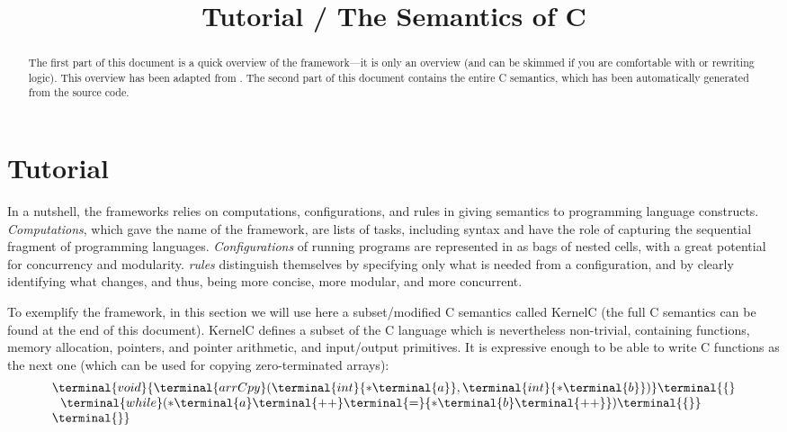 \documentclass{article}
\title{\K Tutorial \slash{} The Semantics of C}
\begin{document}
\maketitle

\begin{abstract}The first part of this document is a quick overview of the \K framework---it is only an overview (and can be skimmed if you are comfortable with \K or rewriting logic).  This overview has been adapted from \citet{serbanuta-2010-thesis}.  The second part of this document contains the entire C semantics, which has been automatically generated from the source code.
\end{abstract}

\section{\K Tutorial}
In a nutshell, the \K frameworks relies on computations, configurations, and \K rules in giving semantics to programming language constructs.  
{\em Computations}, which gave the name of the framework, are lists of tasks, including syntax and have the role of capturing the sequential fragment of programming languages.  {\em Configurations} of running programs are represented in \K as bags of nested cells, with a great potential for concurrency and modularity.  {\em \K rules} distinguish themselves by specifying only what is needed from a configuration, and by clearly identifying what changes, and thus, being more concise, more modular, and more concurrent.

To exemplify the \K framework, in this section we will use here a subset/modified C semantics called {\sc KernelC} (the full C semantics can be found at the end of this document).   {\sc KernelC} defines a subset of the C language which is nevertheless non-trivial, containing functions, memory allocation, pointers, and pointer arithmetic, and input/output primitives.  It is expressive enough to be able to write C functions as the next one (which can be used for copying zero-terminated arrays):
\[\begin{array}{l}
\terminal{void}
{
  {\terminal{arrCpy}
  }
  (\terminal{int}{
    \ast\terminal{a}
    }, \terminal{int}{
     \ast\terminal{b}
     }
     ) }
     \terminal{\{} \\
     \ \ \terminal{while}   (
     {  
       {\ast\terminal{a}}
       \terminal{++}
     }\terminal{=}
     {
     {\ast\terminal{b}}
     \terminal{++}
     }
     )\terminal{\{\}} 
   \\ \terminal{\}}
   \end{array}\]
   
\end{document}

